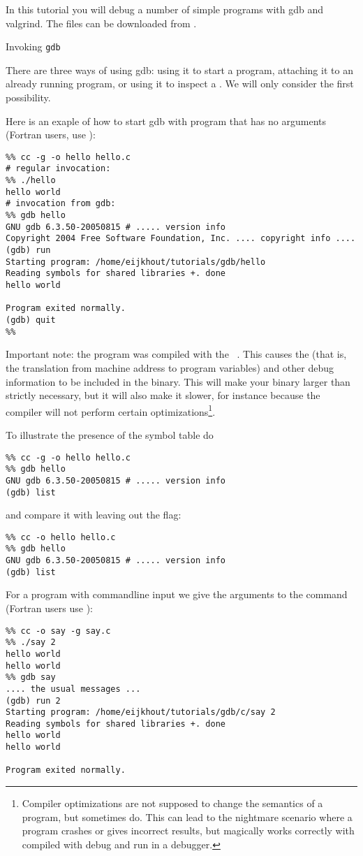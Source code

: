 In this tutorial you will debug a number of simple programs with
gdb and valgrind. The files can be downloaded from
.

 {Invoking {\tt gdb}}

There are three ways of using gdb: using it to start a program,
attaching it to an already running program, or using it to inspect a
. We will only consider the first possibility.

Here is an exaple of how to start gdb with program that has no
arguments (Fortran users, use ):
\begin{verbatim}
%% cc -g -o hello hello.c
# regular invocation:
%% ./hello
hello world
# invocation from gdb:
%% gdb hello
GNU gdb 6.3.50-20050815 # ..... version info
Copyright 2004 Free Software Foundation, Inc. .... copyright info ....
(gdb) run
Starting program: /home/eijkhout/tutorials/gdb/hello 
Reading symbols for shared libraries +. done
hello world

Program exited normally.
(gdb) quit
%%
\end{verbatim}

Important note: the program was compiled with the ~. This causes the  (that is, the
translation from machine address to program variables) and other debug
information to be included in the binary. This will make your binary
larger than strictly necessary, but it will also make it slower, for
instance because the compiler will not perform certain
optimizations\footnote{Compiler optimizations are not supposed to
  change the semantics of a program, but sometimes do. This can lead
  to the nightmare scenario where a program crashes or gives incorrect
  results, but magically works correctly with compiled with debug and
  run in a debugger.}.

To illustrate the presence of the symbol table do
\begin{verbatim}
%% cc -g -o hello hello.c
%% gdb hello
GNU gdb 6.3.50-20050815 # ..... version info
(gdb) list
\end{verbatim}
and compare it with leaving out the  flag:
\begin{verbatim}
%% cc -o hello hello.c
%% gdb hello
GNU gdb 6.3.50-20050815 # ..... version info
(gdb) list
\end{verbatim}

For a program with commandline input we give the arguments to the
 command (Fortran users use ):
\begin{verbatim}
%% cc -o say -g say.c
%% ./say 2
hello world
hello world
%% gdb say
.... the usual messages ...
(gdb) run 2
Starting program: /home/eijkhout/tutorials/gdb/c/say 2
Reading symbols for shared libraries +. done
hello world
hello world

Program exited normally.
\end{verbatim}

